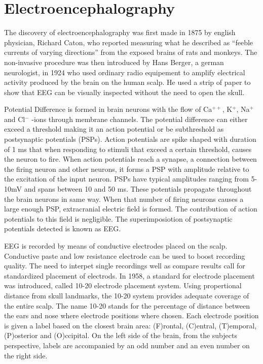 \documentclass[12pt, a4paper, fleqn]{memoir}%
\begin{document}
\section{Electroencephalography}
\label{sec:Electroencephalography}
The discovery of electroencephalography was first made in 1875 by english physician, Richard Caton, who reported measuring what he described as ``feeble currents of varying directions'' from the exposed brains of rats and monkeys. The non-invasive procedure was then introduced by Hans Berger, a german neurologist, in 1924 who used ordinary radio equipement to amplify electrical activity produced by the brain on the human scalp. He used a strip of paper to show that EEG can be visually inspected without the need to open the skull.

Potential Difference is formed in brain neurons with the flow of Ca$^{++}$, K$^{+}$, Na$^{+}$ and Cl$^{-}$ -ions through membrane channels. The potential difference can either exceed a threshold making it an action potential or be subthreshold as postsynaptic potentials (PSPs). Action potentials are spike shaped with duration of 1 ms that when responding to stimuli that exceed a certain threshold, causes the neuron to fire. When action potentials reach a synapse, a connection between the firing neuron and other neurons, it forms a PSP with amplitude relative to the excitation of the input neuron. PSPs have typical amplitudes ranging from 5-10mV and spans between 10 and 50 ms. These potentials propagate throughout the brain neurons in same way. When that number of firing neurons causes a large enough PSP, extracranial electric field is formed. The contribution of action potentials to this field is negligible. The superimposiotion of postsynaptic potentials detected is known as EEG.

EEG is recorded by means of conductive electrodes placed on the scalp. Conductive paste and low resistance electrode can be used to boost recording quality. The need to interpet single recordings well as compare results call for standardized placement of electrods. In 1958, a standard for electrode placement was introduced, called 10-20 electrode placement system. Using propertional distance from skull landmarks, the 10-20 system provides adequate coverage of the entire scalp. The name 10-20 stands for the percentage of distance between the ears and nose where electrode positions where chosen. Each electrode position is given a label based on the closest brain area: (F)rontal, (C)entral, (T)emporal, (P)osterior and (O)ccipital. On the left side of the brain, from the subjects perspective, labels are accompanied by an odd number and an even number on the right side.
\end{document}
